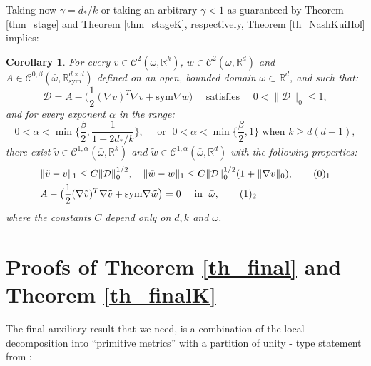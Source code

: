 \documentclass[reqno,twoside,11pt]{amsart}
\newcommand{\sym}{\mathrm{sym}}
\newcommand{\R}{\mathbb{R}}
\numberwithin{equation}{section}
\theoremstyle{plain}
\newtheorem{corollary}[theorem]{Corollary}
\theoremstyle{definition}
\begin{document}
\bigskip

Taking now $\gamma= d_*/k$ or taking an arbitrary $\gamma<1$ as
guaranteed by Theorem \ref{thm_stage} and Theorem \ref{thm_stageK}, respectively,
Theorem \ref{th_NashKuiHol} implies:

\begin{corollary}\label{th_NKH}
For every $v\in\mathcal{C}^2(\bar\omega,\R^k)$, $w\in\mathcal{C}^2(\bar\omega,\R^d)$ and
$A\in\mathcal{C}^{0,\beta}(\bar\omega, \R^{d\times d}_\sym)$ defined
on an open, bounded domain $\omega\subset\R^d$, and such that:
$$\mathcal{D}=A-\big(\frac{1}{2}(\nabla v)^T\nabla v + \sym\nabla
w\big) \quad\mbox{ satisfies } \quad 0<\|\mathcal{D}\|_0\leq 1,$$
and for every exponent $\alpha$ in the range:
\begin{equation*}
0< \alpha <\min\Big\{\frac{\beta}{2},\frac{1}{1+2d_*/k}\Big\},
\quad\mbox{ or }\;
0< \alpha <\min\Big\{\frac{\beta}{2},1\Big\} \mbox{ when $k\geq d(d+1)$},
\end{equation*}
there exist $\tilde v\in\mathcal{C}^{1,\alpha}(\bar\omega,\R^k)$ and
$\tilde w\in\mathcal{C}^{1,\alpha}(\bar\omega,\R^d)$ with the following properties:
\begin{align*}
& \|\tilde v - v\|_1\leq C\|\mathcal{D}\|_0^{1/2}, \quad \|\tilde w -
w\|_1\leq C\|\mathcal{D}\|_0^{1/2}(1+\|\nabla v\|_0),
\tag*{(\theequation)$_1$}\refstepcounter{equation} \label{HHbound1}\vspace{1mm}\\
& A-\big(\frac{1}{2}(\nabla \tilde v)^T\nabla \tilde v + \sym\nabla
\tilde w\big) =0 \quad\mbox{ in }\; \bar\omega, \tag*{(\theequation)$_2$}\label{HHbound2} 
\end{align*}
where the constants $C$ depend only on $d, k$ and $\omega$.
\end{corollary}

\section{Proofs of Theorem \ref{th_final} and Theorem \ref{th_finalK}}\label{sec5}

The final auxiliary result that we need, is a combination of the
local decomposition into ``primitive metrics'' with a partition of unity -
type statement from \cite[Lemma 3.3]{Laszlo}:
\end{document}
